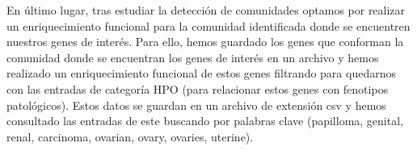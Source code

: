 \vspace{3pt}

En último lugar, tras estudiar la detección de comunidades optamos por realizar un enriquecimiento funcional para la comunidad identificada donde se encuentren nuestros genes de interés. Para ello, hemos guardado los genes que conforman la comunidad donde se encuentran los genes de interés en un archivo y hemos realizado un enriquecimiento funcional de estos genes filtrando para quedarnos con las entradas de categoría HPO \cite{hpojax} (para relacionar estos genes con fenotipos patológicos).  Estos datos se guardan en un archivo de extensión csv y hemos consultado las entradas de este buscando por palabras clave (papilloma, genital, renal, carcinoma, ovarian, ovary, ovaries, uterine). 


